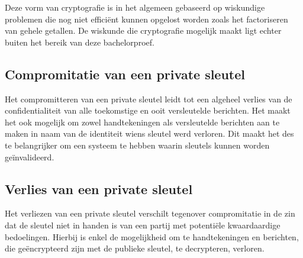 Deze vorm van cryptografie is in het algemeen gebaseerd op wiskundige problemen
die nog niet efficiënt kunnen opgelost worden zoals het factoriseren van gehele
getallen. De wiskunde die cryptografie mogelijk maakt ligt echter buiten het
bereik van deze bachelorproef.

\subsection{Compromitatie van een private sleutel}
\label{subsec:comprimitatie-van-een-private-sleutel}
Het compromitteren van een private sleutel leidt tot een algeheel verlies van de
confidentialiteit van alle toekomstige en ooit versleutelde berichten. Het maakt
het ook mogelijk om zowel handtekeningen als versleutelde berichten aan te maken
in naam van de identiteit wiens sleutel werd verloren. Dit maakt het des te
belangrijker om een systeem te hebben waarin sleutels kunnen worden
geïnvalideerd.

\subsection{Verlies van een private sleutel}
\label{subsec:verlies-van-een-private-sleutel}
Het verliezen van een private sleutel verschilt tegenover compromitatie in de
zin dat
de sleutel niet in handen is van een partij met potentiële kwaardaardige
bedoelingen. Hierbij is enkel de mogelijkheid om te handtekeningen en berichten,
die geëncrypteerd zijn met de publieke sleutel, te decrypteren, verloren.
